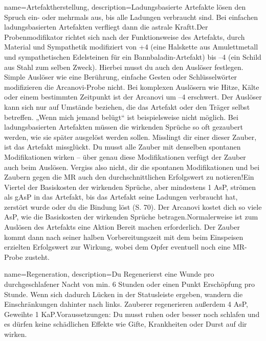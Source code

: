{
    name={Artefaktherstellung},
    description={Ladungsbasierte Artefakte lösen den Spruch ein- oder mehrmals aus, bis alle Ladungen verbraucht sind. Bei einfachen ladungsbasierten Artefakten verfliegt dann die astrale Kraftt.\newline     Der Probenmodifikator richtet sich nach der Funktionsweise des Artefakts, durch Material und Sympathetik modifiziert von +4 (eine Halskette aus Amulettmetall und sympathetischen Edelsteinen für ein Bannbaladin-Artefakt) bis –4 (ein Schild aus Stahl zum selben Zweck). Hierbei musst du auch den Auslöser festlegen. Simple Auslöser wie eine Berührung, einfache Gesten oder Schlüsselwörter modifizieren die Arcanovi-Probe nicht. Bei komplexen Auslösern wie Hitze, Kälte oder einem bestimmten Zeitpunkt ist der Arcanovi um –4 erschwert. Der Auslöser kann sich nur auf Umstände beziehen, die das Artefakt oder den Träger selbst betreffen. „Wenn mich jemand belügt“ ist beispielsweise nicht möglich. \newline     Bei ladungsbasierten Artefakten müssen die wirkenden Sprüche so oft gezaubert werden, wie sie später ausgelöst werden sollen. Misslingt dir einer dieser Zauber, ist das Artefakt missglückt. Du musst alle Zauber mit denselben spontanen Modifikationen wirken – über genau diese Modifikationen verfügt der Zauber auch beim Auslösen. Vergiss also nicht, dir die spontanen Modifikationen und bei Zaubern gegen die MR auch den durchschnittlichen Erfolgswert zu notieren!\newline     Ein Viertel der Basiskosten der wirkenden Sprüche, aber mindestens 1 AsP, strömen als gAsP in das Artefakt, bis das Artefakt seine Ladungen verbraucht hat, zerstört wurde oder du die Bindung löst (S. 70). Der Arcanovi kostet dich so viele AsP, wie die Basiskosten der wirkenden Sprüche betragen.\newline     Normalerweise ist zum Auslösen des Artefakts eine Aktion Bereit machen erforderlich. Der Zauber kommt dann nach seiner halben Vorbereitungszeit mit dem beim Einspeisen erzielten Erfolgswert zur Wirkung, wobei dem Opfer eventuell noch eine MR-Probe zusteht.}
}


{
    name={Regeneration},
    description={Du Regenerierst eine Wunde pro durchgeschlafener Nacht von min. 6 Stunden oder einen Punkt Erschöpfung pro Stunde. Wenn sich dadurch Lücken in der Statusleiste ergeben, wandern die Einschränkungen dahinter nach links. Zauberer regenerieren außerdem 4 AsP, Geweihte 1 KaP.\newline Voraussetzungen: Du musst ruhen oder besser noch schlafen und es dürfen keine schädlichen Effekte wie Gifte, Krankheiten oder Durst auf dir wirken.}
}


